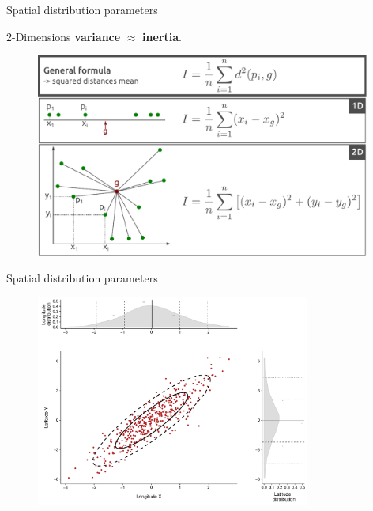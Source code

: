 \begin{frame}{Spatial distribution parameters}

2-Dimensions \textbf{variance} $\approx$ \textbf{inertia}.

\begin{figure}
\includegraphics[width=11cm]{Inertie_EN.pdf}
\end{figure}


\end{frame}

\begin{frame}{Spatial distribution parameters}

\begin{figure}
\includegraphics[width=9cm]{Ellipsis_dev_EN.pdf}
\end{figure}

\end{frame}


